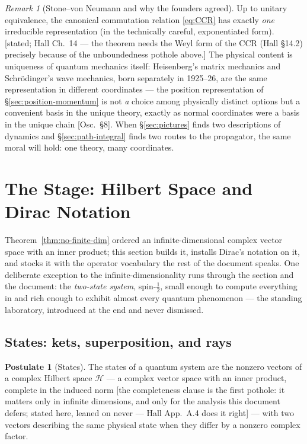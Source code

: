 \documentclass[11pt]{article}
\theoremstyle{plain}
\theoremstyle{definition}
\newtheorem{postulate}[theorem]{Postulate}
\theoremstyle{remark}
\newtheorem{remark}[theorem]{Remark}
\begin{document}
\begin{remark}[Stone--von Neumann and why the founders agreed]
\label{rem:stone-von-neumann}
Up to unitary equivalence, the canonical commutation relation
\eqref{eq:CCR} has exactly \emph{one} irreducible representation (in
the technically careful, exponentiated form). [stated; Hall Ch.\ 14 --- the
theorem needs the Weyl form of the CCR (Hall \S14.2) precisely
because of the unboundedness pothole above.] The physical content is uniqueness of
quantum mechanics itself: Heisenberg's matrix mechanics and
Schr\"odinger's wave mechanics, born separately in 1925--26, are the
same representation in different coordinates --- the position
representation of \S\ref{sec:position-momentum} is not \emph{a}
choice among physically distinct options but a convenient basis in
the unique theory, exactly as normal coordinates were a basis in the
unique chain [Osc.\ \S8]. When \S\ref{sec:pictures} finds two
descriptions of dynamics and \S\ref{sec:path-integral} finds two
routes to the propagator, the same moral will hold: one theory, many
coordinates.
\end{remark}

\section{The Stage: Hilbert Space and Dirac Notation}
\label{sec:hilbert}

Theorem~\ref{thm:no-finite-dim} ordered an infinite-dimensional
complex vector space with an inner product; this section builds it,
installs Dirac's notation on it, and stocks it with the operator
vocabulary the rest of the document speaks. One deliberate exception
to the infinite-dimensionality runs through the section and the
document: the \emph{two-state system}, spin-$\tfrac12$, small enough
to compute everything in and rich enough to exhibit almost every
quantum phenomenon --- the standing laboratory, introduced at the
end and never dismissed.

\subsection{States: kets, superposition, and rays}
\label{sec:kets}

\begin{postulate}[States]\label{post:states}
The states of a quantum system are the nonzero vectors of a complex
Hilbert space $\mathcal H$ --- a complex vector space with an inner
product, complete in the induced norm [the completeness clause is
the first pothole: it matters only in infinite dimensions, and only
for the analysis this document defers; stated here,
leaned on never --- Hall App.\ A.4 does it right] --- with two vectors
describing the same physical state when they differ by a nonzero
complex factor.
\end{postulate}
\end{document}
